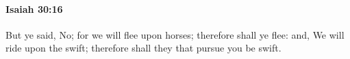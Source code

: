 
		\paragraph{Isaiah 30:16} %
			\label{ISAIAH-30-16}

			But ye said, No; for we will flee upon horses; therefore shall ye flee: and, We will ride upon the swift; therefore shall they that pursue you be swift.


